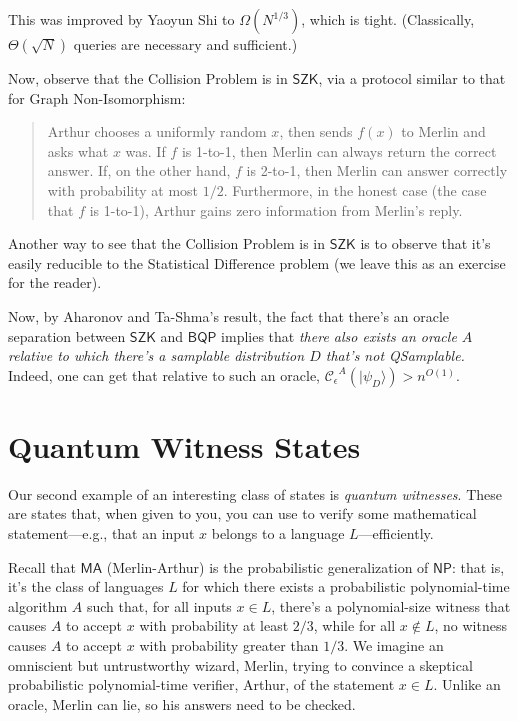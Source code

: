 \documentclass[12pt]{report}
\theoremstyle{plain}
\theoremstyle{definition}
\renewcommand{\ket}[1]{|#1\rangle}
\newcommand{\sizee}{\ensuremath{\mathcal{C}_\epsilon}}
\begin{document}
This was improved by Yaoyun Shi \cite{shi} to $\Omega(N^{1/3})$, which is tight.  (Classically, $\Theta(\sqrt{N})$ queries are necessary and sufficient.)

Now, observe that the Collision Problem is in $\mathsf{SZK}$, via a protocol similar to that for Graph Non-Isomorphism:
\begin{quote}
Arthur chooses a uniformly random $x$, then sends $f(x)$ to Merlin and asks what $x$ was.  If $f$ is 1-to-1, then Merlin can always return the correct answer.
If, on the other hand, $f$ is 2-to-1, then Merlin can answer correctly with probability at most $1/2$.  Furthermore, in the honest case (the case that $f$ is 1-to-1), Arthur gains zero information from Merlin's reply.
\end{quote}

Another way to see that the Collision Problem is in $\mathsf{SZK}$ is to observe that it's easily reducible to the Statistical Difference problem (we leave this as an exercise for the reader).

Now, by Aharonov and Ta-Shma's result, the fact that there's an oracle separation between $\mathsf{SZK}$ and $\mathsf{BQP}$ implies that {\em there also exists an oracle $A$ relative to which there's a samplable distribution $D$ that's not QSamplable.}  Indeed, one can get that relative to such an oracle, $\sizee^A(\ket{\psi_D})>n^{O(1)}$.


\section{Quantum Witness States}

Our second example of an interesting class of states is {\em quantum witnesses}. These are states that, when given to you, you can use to verify some mathematical statement---e.g., that an input $x$ belongs to a language $L$---efficiently.

Recall that $\mathsf{MA}$ (Merlin-Arthur) is the probabilistic generalization of $\mathsf{NP}$: that is, it's the class of languages $L$ for which there exists
a probabilistic polynomial-time algorithm $A$ such that, for all inputs $x\in L$, there's a polynomial-size witness that causes $A$ to accept $x$ with probability at least $2/3$, while for all $x\not\in L$, no witness causes $A$ to accept $x$ with probability greater than $1/3$.  We imagine an omniscient but untrustworthy wizard, Merlin, trying to convince a skeptical probabilistic polynomial-time verifier, Arthur, of the statement $x\in L$. Unlike an oracle, Merlin can lie, so his answers
need to be checked.
\end{document}
